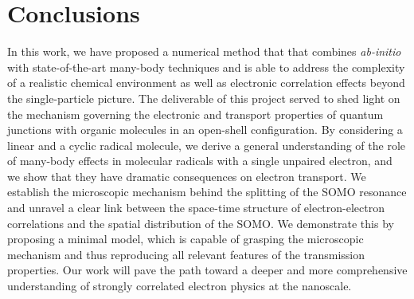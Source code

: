 \documentclass[aps,prx,twocolumn,superscriptaddress]{revtex4-2}
\begin{document}
\section{Conclusions}
In this work, we have proposed a numerical method that 
that combines \emph{ab-initio} with state-of-the-art many-body techniques 
and is able to address the complexity of a realistic chemical environment 
as well as electronic correlation effects beyond the single-particle picture. 
The deliverable of this project served to shed light on the mechanism 
governing the electronic and transport properties %
of quantum junctions 
with organic molecules in an open-shell configuration. 
By considering a linear and a cyclic radical molecule, 
we derive a general understanding of the role of many-body effects 
in molecular radicals with a single unpaired electron, 
and we show that they have dramatic consequences on electron transport.
We establish the microscopic mechanism behind the splitting of the SOMO resonance 
and unravel a clear link between the space-time structure of electron-electron correlations  
and the spatial distribution of the SOMO. 
We demonstrate this by proposing a minimal model, 
which is capable of grasping the microscopic mechanism 
and thus reproducing all relevant features of the transmission properties. 
Our work will pave the path toward a deeper and more comprehensive 
understanding of strongly correlated electron physics at the nanoscale. \\



\end{document}
